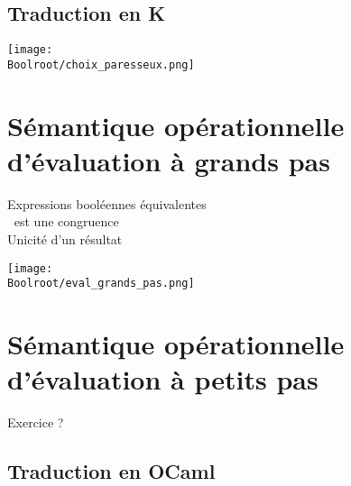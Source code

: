 	

	\subsection{Traduction en K}
	


\texttt{[image: \\Boolroot/choix\_paresseux.png]}










\section{Sémantique opérationnelle d’évaluation à grands pas}
Expressions booléennes équivalentes \\
$~$ est une congruence \\
Unicité d'un résultat

\texttt{[image: \\Boolroot/eval\_grands\_pas.png]}

\section{Sémantique opérationnelle d’évaluation à petits pas}
Exercice ?
	
	\subsection{Traduction en OCaml}





